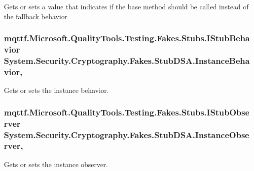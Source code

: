 Gets or sets a value that indicates if the base method should be called instead of the fallback behavior

\hypertarget{class_system_1_1_security_1_1_cryptography_1_1_fakes_1_1_stub_d_s_a_abb4fb06a9ba79764ca0d21d11eb73520}{
\subsubsection[{Instance\-Behavior}]{\setlength{\rightskip}{0pt plus 5cm}mqttf.\-Microsoft.\-Quality\-Tools.\-Testing.\-Fakes.\-Stubs.\-I\-Stub\-Behavior System.\-Security.\-Cryptography.\-Fakes.\-Stub\-D\-S\-A.\-Instance\-Behavior\hspace{0.3cm}{\ttfamily [get]}, {\ttfamily [set]}}}\label{class_system_1_1_security_1_1_cryptography_1_1_fakes_1_1_stub_d_s_a_abb4fb06a9ba79764ca0d21d11eb73520}


Gets or sets the instance behavior.

\hypertarget{class_system_1_1_security_1_1_cryptography_1_1_fakes_1_1_stub_d_s_a_adefb56976b2122d9b3acd311e5a28f8e}{
\subsubsection[{Instance\-Observer}]{\setlength{\rightskip}{0pt plus 5cm}mqttf.\-Microsoft.\-Quality\-Tools.\-Testing.\-Fakes.\-Stubs.\-I\-Stub\-Observer System.\-Security.\-Cryptography.\-Fakes.\-Stub\-D\-S\-A.\-Instance\-Observer\hspace{0.3cm}{\ttfamily [get]}, {\ttfamily [set]}}}\label{class_system_1_1_security_1_1_cryptography_1_1_fakes_1_1_stub_d_s_a_adefb56976b2122d9b3acd311e5a28f8e}


Gets or sets the instance observer.

